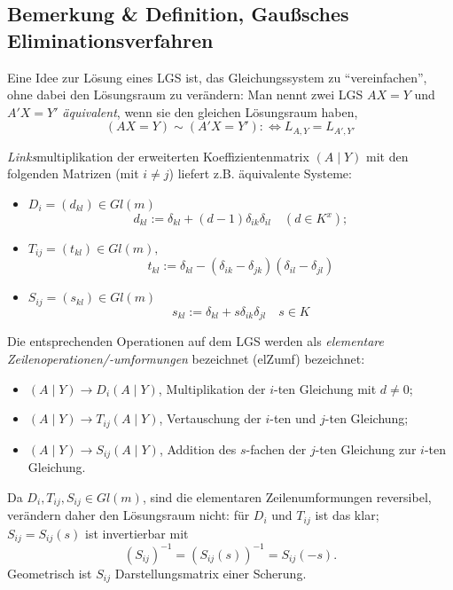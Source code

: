 \subsection{Bemerkung \& Definition, Gaußsches Eliminationsverfahren}
	\begin{Definition}
	Eine Idee zur Lösung eines LGS ist, das Gleichungssystem zu "`vereinfachen"', ohne dabei den Lösungsraum zu verändern: Man nennt zwei LGS $ AX=Y$ und $A'X=Y' $ \emph{äquivalent}, wenn sie den gleichen Lösungsraum haben,
		\[ (AX=Y)\sim (A'X=Y'):\Leftrightarrow L_{A,Y} = L_{A',Y'} \]
	\end{Definition}
	\emph{Links}multiplikation der erweiterten Koeffizientenmatrix $ (A\mid Y) $ mit den folgenden Matrizen (mit $ i\neq j $) liefert z.B. äquivalente Systeme:
	\begin{itemize}
		\item $ D_i = (d_{kl})\in Gl(m) $
			\[ d_{kl} := \delta_{kl}+(d-1)\delta_{ik}\delta_{il}\quad (d\in K^x); \]
		\item $ T_{ij} = (t_{kl})\in Gl(m), $
			\[ t_{kl} := \delta_{kl}-(\delta_{ik}-\delta_{jk})(\delta_{il}-\delta_{jl}) \]
		\item $ S_{ij}=(s_{kl})\in Gl(m) $
			\[ s_{kl} := \delta_{kl}+s\delta_{ik}\delta_{jl} \quad s\in K\]
	\end{itemize}
	Die entsprechenden Operationen auf dem LGS werden als \emph{elementare Zeilenoperationen/-umformungen} bezeichnet (elZumf) bezeichnet:
	\begin{itemize}
		\item $ (A\mid Y) \to D_i (A\mid Y) $, Multiplikation der $ i $-ten Gleichung mit $ d\neq 0 $;
		\item $ (A\mid Y) \to T_{ij} (A\mid Y) $, Vertauschung der $ i $-ten und $ j $-ten Gleichung;
		\item $ (A\mid Y) \to S_{ij} (A\mid Y)$, Addition des $ s $-fachen der $ j $-ten Gleichung zur $ i $-ten Gleichung.
	\end{itemize}
	Da $ D_i,T_{ij},S_{ij}\in Gl(m) $, sind die elementaren Zeilenumformungen reversibel, verändern daher den Lösungsraum nicht: für $ D_i $ und $ T_{ij} $ ist das klar; $ S_{ij} = S_{ij}(s) $ ist invertierbar mit
		\[ (S_{ij})^{-1} = (S_{ij}(s))^{-1} = S_{ij}(-s). \]
	Geometrisch ist $ S_{ij} $ Darstellungsmatrix einer Scherung.
	
